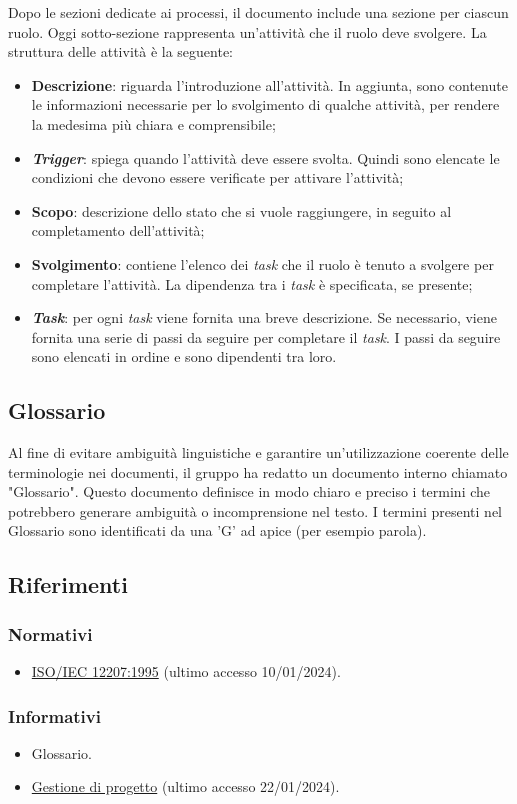 Dopo le sezioni dedicate ai processi, il documento include una sezione per
ciascun ruolo. Oggi sotto-sezione rappresenta un'attività che il ruolo deve
svolgere.  La struttura delle attività è la seguente:
\begin{itemize}
	\item \textbf{Descrizione}: riguarda l'introduzione all'attività.
	      In aggiunta, sono contenute le informazioni necessarie per lo
	      svolgimento di qualche attività, per rendere la medesima più chiara e
	      comprensibile;

	\item \textbf{\textit{Trigger}}: spiega quando l'attività deve essere
	      svolta. Quindi sono elencate le condizioni che devono essere
	      verificate per attivare l'attività;

	\item \textbf{Scopo}: descrizione dello stato che si vuole raggiungere, in
	      seguito al completamento dell'attività;

	\item \textbf{Svolgimento}: contiene l'elenco dei \textit{task} che il
	      ruolo è tenuto a svolgere per completare l'attività. La dipendenza tra
	      i \textit{task} è specificata, se presente;

	\item \textbf{\textit{Task}}: per ogni \textit{task} viene fornita una
	      breve descrizione. Se necessario, viene fornita una serie di passi da
	      seguire per completare il \textit{task}. I passi da seguire sono
	      elencati in ordine e sono dipendenti tra loro.
\end{itemize}

\subsection{Glossario}
Al fine di evitare ambiguità linguistiche e garantire un’utilizzazione coerente delle terminologie nei documenti, il gruppo ha redatto un documento interno chiamato "Glossario". Questo
documento definisce in modo chiaro e preciso i termini che potrebbero generare ambiguità
o incomprensione nel testo. I termini presenti nel Glossario sono identificati da una ’G’ ad
apice (per esempio parola\g ).


\subsection{Riferimenti}

\subsubsection{Normativi}
\begin{itemize}
	\item \href{https://www.math.unipd.it/~tullio/IS-1/2009/Approfondimenti/ISO_12207-1995.pdf}{ISO/IEC 12207:1995} (ultimo accesso 10/01/2024).
\end{itemize}

\subsubsection{Informativi}
\begin{itemize}
	\item Glossario.
	\item \href{https://www.math.unipd.it/~tullio/IS-1/2023/Dispense/T4.pdf}{Gestione di progetto} (ultimo accesso 22/01/2024).
\end{itemize}

